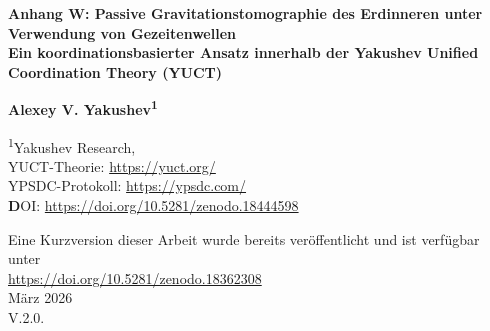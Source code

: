 \documentclass[12pt,a4paper]{article}
\theoremstyle{remark}
\begin{document}
	
	\begin{titlepage}
		\begin{center}
			\vspace*{1cm}
			
			\Huge\textbf{Anhang W: Passive Gravitationstomographie des Erdinneren unter Verwendung von Gezeitenwellen} \\
			\vspace{0.5cm}
			\Large\textbf{Ein koordinationsbasierter Ansatz innerhalb der Yakushev Unified Coordination Theory (YUCT)}
			
			\vspace{1.5cm}
			
			\Large\textbf{Alexey V. Yakushev\textsuperscript{1}}
			
			\vspace{0.3cm}
			\large
			\textsuperscript{1}Yakushev Research, \\
			YUCT-Theorie: \url{https://yuct.org/}\\
			YPSDC-Protokoll: \url{https://ypsdc.com/}\\
			
			\vspace{2cm}
			\textbf DOI: \url{https://doi.org/10.5281/zenodo.18444598}\\
			
			\vspace{1cm}
			
			\vspace{0cm}
			\large 
			Eine Kurzversion dieser Arbeit wurde bereits veröffentlicht und ist verfügbar unter\\ \url{https://doi.org/10.5281/zenodo.18362308}\\
			\vspace{1cm}
			März 2026 \\ \large V.2.0.
			
			\vspace{2cm}
			

\end{center}
\end{titlepage}
\end{document}
